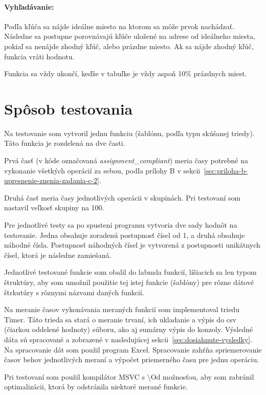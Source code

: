 \documentclass[a4paper,slovak,12pt]{article}
\begin{document}
    \paragraph{Vyhľadávanie:}
    Podľa kľúča sa nájde ideálne miesto na ktorom sa môže prvok nachádzať.
    Následne sa postupne porovnávajú kľúče uložené na adrese od ideálneho miesta, pokiaľ sa nenájde zhodný kľúč, alebo prázdne miesto.
    Ak sa nájde zhodný kľúč, funkcia vráti hodnotu.

    Funkcia sa vždy ukončí, keďže v tabuľke je vždy aspoň 10\% prázdnych miest.


    \section{Spôsob testovania}\label{sec:sposob-testovania}

    Na testovanie som vytvoril jednu funkciu (šablónu, podľa typu skúšanej triedy).
    Táto funkcia je rozdelená na dve časti.

    Prvá časť (v kóde označovaná \textit{assignment\_compliant}) meria časy potrebné na vykonanie všetkých operácií za sebou, podľa
    prílohy B v sekcii~\ref{sec:priloha-b-upresnenie-znenia-zadania-c-2}.

    Druhá časť meria časy jednotlivých operácii v skupinách.
    Pri testovaní som nastavil veľkosť skupiny na 100.

    Pre jednotlivé testy sa po spustení programu vytvoria dve sady hodnôt na testovanie.
    Jedna obsahuje zoradenú postupnosť čísel od 1, a druhá obsahuje náhodné čísla.
    Postupnosť náhodných čísel je vytvorená z postupnosti unikátnych čísel, ktorá je následne zamiešaná.

    Jednotlivé testované funkcie som obalil do labmda funkcií, líšiacich sa len typom štruktúry, aby som umožnil použitie
    tej istej funkcie (šablóny) pre rôzne dátové štrkutúry s rôznymi názvami daných funkcií.

    Na meranie časov vykonávania meraných funkcií som implementoval triedu Timer.
    Táto trieda sa stará o meranie trvaní, ich ukladanie a výpis do csv (čiarkou oddelené hodnoty) súboru, ako aj sumárny výpis do konzoly.
    Výsledné dáta sú spracované a zobrazené v nasledujúcej sekcii~\ref{sec:dosiahnute-vysledky}.
    Na spracovanie dát som použil program Excel.
    Spracovanie zahŕňa spriemerovanie časov behov jednotlivých meraní a výpočet priemerného času pre jednu operáciu.

    Pri testovaní som použil kompilátor MSVC s \textbackslash{}Od možnosťou, aby som zabránil optimalizácii, ktorá by odstránila niektoré merané funkcie.
\end{document}
